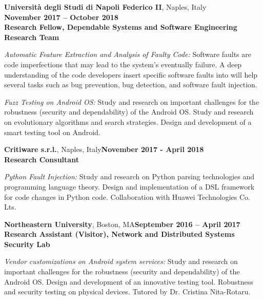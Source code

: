 \documentclass[margin,line]{resume}
\begin{document}
\begin{resume}
\textbf{Universit\`a degli Studi di Napoli Federico II}, Naples, Italy\\ \phantom{.} \hfill \textbf{November 2017 -- October 2018}\\
\textbf{Research Fellow, Dependable Systems and Software Engineering Research Team}\hfill 
\vspace{-3mm}\\\vspace{-1mm}
\begin{list2}
	\item \filbreak\textit{Automatic Feature Extraction and Analysis of Faulty Code:} Software faults are code imperfections that may lead to the system's eventually failure. A deep understanding of the code developers insert specific software faults into will help several tasks such as bug prevention, bug detection, and software fault injection.
    \item \filbreak\textit{Fuzz Testing on Android OS:} Study and research on important challenges for the robustness (security and dependability) of the Android OS. Study and research on evolutionary algorithms and search strategies. Design and development of a smart testing tool on Android.
\end{list2}

\textbf{Critiware s.r.l.}, Naples, Italy\hfill\textbf{November 2017 - April 2018}\\
\textbf{Research Consultant}\hfill 
\vspace{-3mm}\\\vspace{-1mm}
\begin{list2}
	\item \filbreak\textit{Python Fault Injection:} Study and research on Python parsing technologies and programming language theory. Design and implementation of a DSL framework for code changes in Python code. Collaboration with Huawei Technologies Co. Lts.
\end{list2}

\textbf{Northeastern University}, Boston, MA\hfill\textbf{September 2016 -- April 2017}\\
\textbf{Research Assistant (Visitor), Network and Distributed Systems Security Lab}\hfill 
\vspace{-3mm}\\\vspace{-1mm}
\begin{list2}
	\item \filbreak\textit{Vendor customizations on Android system services:} Study and research on important challenges for the robustness (security and dependability) of the Android OS. Design and development of an innovative testing tool. Robustness and security testing on physical devices. Tutored by Dr. Cristina Nita-Rotaru.
\end{list2}


\end{resume}
\end{document}
